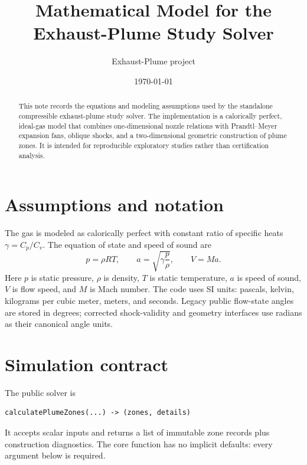 \documentclass[11pt]{article}
\title{Mathematical Model for the Exhaust-Plume Study Solver}
\author{Exhaust-Plume project}
\date{\today}
\newcommand{\Mach}{\mathit{M}}
\newcommand{\gammaa}{\gamma}
\newcommand{\Rgas}{R}
\begin{document}
\maketitle

\begin{abstract}
This note records the equations and modeling assumptions used by the
standalone compressible exhaust-plume study solver.  The implementation is a
calorically perfect, ideal-gas model that combines one-dimensional nozzle
relations with Prandtl--Meyer expansion fans, oblique shocks, and a
two-dimensional geometric construction of plume zones.  It is intended for
reproducible exploratory studies rather than certification analysis.
\end{abstract}

\section{Assumptions and notation}

The gas is modeled as calorically perfect with constant ratio of specific heats
\(\gamma=C_p/C_v\).  The equation of state and speed of sound are
\begin{equation}
  p = \rho \Rgas T,
  \qquad
  a = \sqrt{\gammaa \frac{p}{\rho}},
  \qquad
  V = \Mach a .
\end{equation}
Here \(p\) is static pressure, \(\rho\) is density, \(T\) is static
temperature, \(a\) is speed of sound, \(V\) is flow speed, and \(\Mach\) is
Mach number.  The code uses SI units: pascals, kelvin, kilograms per cubic
meter, meters, and seconds.  Legacy public flow-state angles are stored in
degrees; corrected shock-validity and geometry interfaces use radians as their
canonical angle units.

\section{Simulation contract}

The public solver is
\begin{verbatim}
calculatePlumeZones(...) -> (zones, details)
\end{verbatim}
It accepts scalar inputs and returns a list of immutable zone records plus
construction diagnostics.  The core function has no implicit defaults: every
argument below is required.
\end{document}
